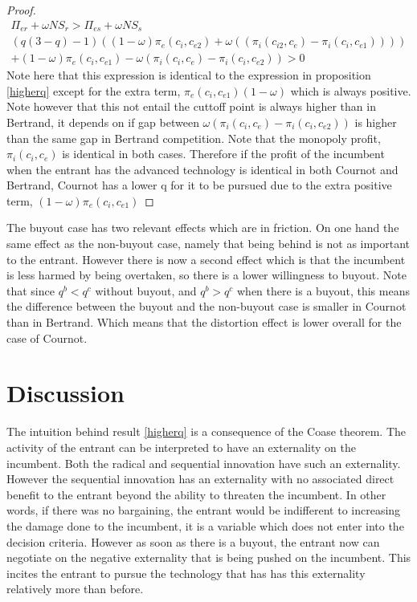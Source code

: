 \begin{proof}
\begin{align*}
\Pi_{er} + \omega NS_{r}
> \Pi_{es} + \omega NS_{s} \\
(q  (3-q)-1)((1-\omega)\pi_{e}(c_i,c_{e2})+\omega((\pi_{i}(c_{i2},c_{e})-\pi_{i}(c_i,c_{e1})))) \\
+(1-\omega)\pi_{e}(c_i,c_{e1})
-\omega(\pi_{i}(c_i,c_{e}) 
-\pi_{i}(c_{i},c_{e2}))>0
\end{align*} 
Note here that this expression is identical to the expression in proposition \ref{higherq} except for the extra term, $\pi_{e}(c_i,c_{e1})(1-\omega)$ which is always positive. Note however that this not entail the cuttoff point is always higher than in Bertrand, it depends on if gap between $\omega(\pi_{i}(c_i,c_{e}) 
-\pi_{i}(c_{i},c_{e2}))$ is higher than the same gap in Bertrand competition. Note that the monopoly profit,$\pi_{i}(c_i,c_{e})$ is identical in both cases. Therefore if the profit of the incumbent when the entrant has the advanced technology is identical in both Cournot and Bertrand, Cournot has a lower q for it to be pursued due to the extra positive term, $(1-\omega) \pi_e(c_i,c_{e1})$ 
\end{proof}

The buyout case has two relevant effects which are in friction. On one hand the same effect as the non-buyout case, namely that being behind is not as important to the entrant. However there is now a second effect which is that the incumbent is less harmed by being overtaken, so there is a lower willingness to buyout. Note that since $q^b<q^c$ without buyout, and $q^b>q^c$ when there is a buyout, this means the difference between the buyout and the non-buyout case is smaller in Cournot than in Bertrand. Which means that the distortion effect is lower overall for the case of Cournot. 

\section{Discussion}\label{discussion}

The intuition behind result \ref{higherq} is a consequence of the Coase theorem. The activity of the entrant can be interpreted to have an externality on the incumbent. Both the radical and sequential innovation have such an externality. However the sequential innovation has an externality with no associated direct benefit to the entrant beyond the ability to threaten the incumbent. In other words, if there was no bargaining, the entrant would be indifferent to increasing the damage done to the incumbent, it is a variable which does not enter into the decision criteria. However as soon as there is a buyout, the entrant now can negotiate on the negative externality that is being pushed on the incumbent. This incites the entrant to pursue the technology that has has this externality relatively more than before. 

